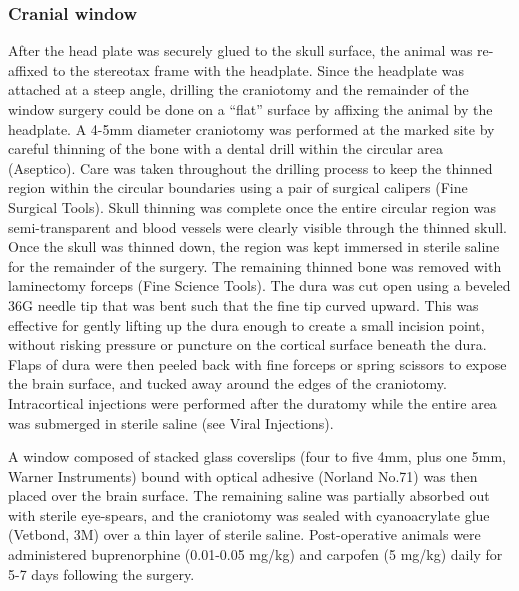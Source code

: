 \subsubsection{Cranial window}
After the head plate was securely glued to the skull surface, the animal was re-affixed to the stereotax frame with the headplate. Since the headplate was attached at a steep angle, drilling the craniotomy and the remainder of the window surgery could be done on a ``flat'' surface by affixing the animal by the headplate. A 4-5mm diameter craniotomy was performed at the marked site by careful thinning of the bone with a dental drill within the circular area (Aseptico). Care was taken throughout the drilling process to keep the thinned region within the circular boundaries using a pair of surgical calipers (Fine Surgical Tools). Skull thinning was complete once the entire circular region was semi-transparent and blood vessels were clearly visible through the thinned skull. Once the skull was thinned down, the region was kept immersed in sterile saline for the remainder of the surgery. The remaining thinned bone was removed with laminectomy forceps (Fine Science Tools). The dura was cut open using a beveled 36G needle tip that was bent such that the fine tip curved upward. This was effective for gently lifting up the dura enough to create a small incision point, without risking pressure or puncture on the cortical surface beneath the dura. Flaps of dura were then peeled back with fine forceps or spring scissors to expose the brain surface, and tucked away around the edges of the craniotomy. Intracortical injections were performed after the duratomy while the entire area was submerged in sterile saline (see Viral Injections).

A window composed of stacked glass coverslips (four to five 4mm, plus one 5mm, Warner Instruments) bound with optical adhesive (Norland No.71) was then placed over the brain surface. The remaining saline was partially absorbed out with sterile eye-spears, and the craniotomy was sealed with cyanoacrylate glue (Vetbond, 3M) over a thin layer of sterile saline. Post-operative animals were administered buprenorphine (0.01-0.05 mg/kg) and carpofen (5 mg/kg) daily for 5-7 days following the surgery.

